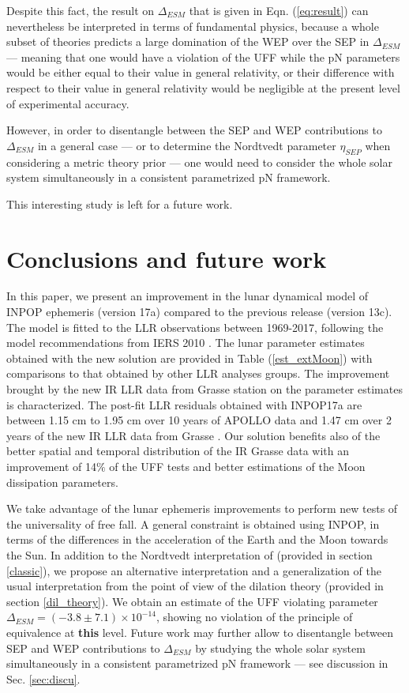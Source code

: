 \documentclass[fleqn,usenatbib,referee]{mnras}
\begin{document}
Despite this fact, the result on $\Delta_{ESM}$ that is given in Eqn. (\ref{eq:result}) can nevertheless be interpreted in terms of fundamental physics, because a whole subset of theories predicts a large domination of the WEP over the SEP in $\Delta_{ESM}$ \cite[]{Damour2010,minazzoli:2016pr} --- meaning that one would have a violation of the UFF while the pN parameters would be either equal to their value in general relativity, or their difference with respect to their value in general relativity would be negligible at the present level of experimental accuracy.

However, in order to disentangle between the SEP and WEP contributions to $\Delta_{ESM}$ in a general case --- or to determine the Nordtvedt parameter $\eta_{SEP}$ when considering a metric theory prior --- one would need to consider the whole solar system simultaneously in a consistent parametrized pN framework. 

This interesting study is left for a future work.


\section{Conclusions and future work}
In this paper, we present an improvement in the lunar dynamical model of INPOP ephemeris (version 17a) compared to the previous release (version 13c). The model is fitted to the LLR observations between 1969-2017, following the model recommendations from IERS 2010 \cite[]{IERS2010}. The lunar parameter estimates obtained with the new solution are provided in Table (\ref{est_extMoon}) with comparisons to that obtained by other LLR analyses groups. The improvement brought by the new IR LLR data from Grasse station on the parameter estimates is characterized. The post-fit LLR residuals obtained with INPOP17a are between 1.15 cm to 1.95 cm over 10 years of APOLLO data and 1.47 cm over 2 years of the new IR LLR data from Grasse \cite[]{Viswanathan2017a}.
Our solution benefits also of the better spatial and temporal distribution of the IR Grasse data with an improvement of 14$\%$ of the UFF tests and better estimations of the Moon dissipation parameters.

We take advantage of the lunar ephemeris improvements to perform new tests of the universality of free fall. A general constraint is obtained using INPOP, in terms of the differences in the acceleration of the Earth and the Moon towards the Sun. In addition to the Nordtvedt interpretation of \cite{1968PhRv..170.1186N} (provided in section \ref{classic}), we propose an alternative interpretation and a generalization of the usual interpretation from the point of view of the dilation theory \cite[]{damour:1994np,hees:2015ax,minazzoli:2016pr} (provided in section \ref{dil_theory}). We obtain an estimate of the UFF violating parameter $\Delta_{ESM} = (-3.8 \pm 7.1) \times10^{-14}$, showing no violation of the principle of equivalence at \textbf{this} level. Future work may further allow to disentangle between SEP and WEP contributions to $\Delta_{ESM}$ by studying the whole solar system simultaneously in a consistent parametrized pN framework --- see discussion in Sec. \ref{sec:discu}.
\end{document}

